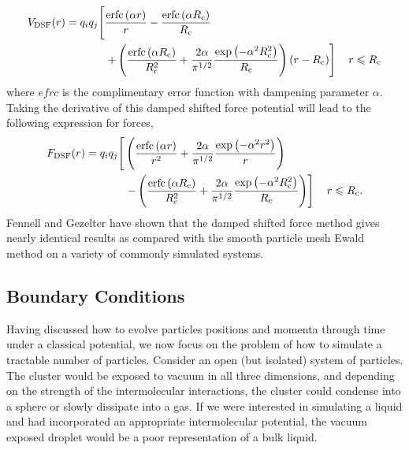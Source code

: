 \begin{equation}
\begin{split}
V_\mathrm{DSF}(r) = q_iq_j\Biggr{[} & \frac{\mathrm{erfc}\left(\alpha r \right)}{r} -\frac{\mathrm{erfc}\left(\alpha R_\mathrm{c} \right) }{R_\mathrm{c}} \\
 & \left. +\left(\frac{\mathrm{erfc}\left(\alpha
R_\mathrm{c}\right)}{R_\mathrm{c}^2}+\frac{2\alpha}{\pi^{1/2}}\frac{\exp\left(-\alpha^2R_\mathrm{c}^2\right)}{R_\mathrm{c}}\right)\left(r-R_\mathrm{c}\right)
\right] \quad r\leqslant R_\textrm{c} 
\label{eq:DSFPot}
\end{split}
\end{equation}
where $efrc$ is the complimentary error function with dampening
parameter $\alpha$. Taking the derivative of this damped shifted force
potential will lead to the following expression for forces,
\begin{equation}
\begin{split}
F_\mathrm{DSF}(r) =
q_iq_j\Biggr{[}&\left(\frac{\textrm{erfc}\left(\alpha r\right)}{r^2}+\frac{2\alpha}{\pi^{1/2}}\frac{\exp{\left(-\alpha^2r^2\right)}}{r}\right) \\ &\left.-\left(\frac{\textrm{erfc}\left(\alpha R_{\textrm{c}}\right)}{R_{\textrm{c}}^2}+\frac{2\alpha}{\pi^{1/2}}\frac{\exp{\left(-\alpha^2R_{\textrm{c}}^2
\right)}}{R_{\textrm{c}}}\right)\right] \quad r\leqslant R_\textrm{c}.
\label{eq:DSFForces}
\end{split}
\end{equation}
Fennell and Gezelter have shown that the damped shifted force method
gives nearly identical results as compared with the smooth particle
mesh Ewald method on a variety of commonly simulated
systems.\cite{Fennell2006}

\subsection{Boundary Conditions}
Having discussed how to evolve particles positions and momenta through
time under a classical potential, we now focus on the problem of how
to simulate a tractable number of particles. Consider an open (but
isolated) system of particles. The cluster would be exposed to vacuum
in all three dimensions, and depending on the strength of the
intermolecular interactions, the cluster could condense into a sphere
or slowly dissipate into a gas. If we were interested in simulating a
liquid and had incorporated an appropriate intermolecular potential,
the vacuum exposed droplet would be a poor representation of a bulk
liquid.

